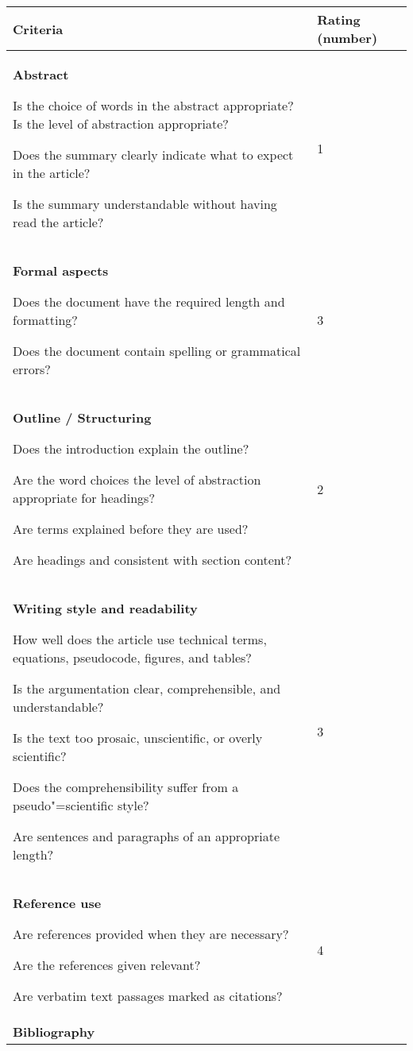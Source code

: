 \documentclass[12pt]{scrartcl}
\begin{document}
\begin{longtable}{|p{12cm}|p{2.5cm}|}	
		\hline
			\textbf{Criteria} & \textbf{Rating (number)} \\
		\hline
		\hline
		\endhead
			\textbf{Abstract}		
						
				Is the choice of words in the abstract appropriate? Is the level of abstraction appropriate?
				
                Does the summary clearly indicate what to expect in the article? 
				
                Is the summary understandable without having read the article?			
			& 1 \ \\
		\hline
			\textbf{Formal aspects}	
				
				Does the document have the required length and formatting?
				
				Does the document contain spelling or grammatical errors?
			& 3 \ \\
		\hline	
			\textbf{Outline / Structuring}		
			
				Does the introduction explain the outline?
				
				Are the word choices the level of abstraction appropriate for headings?
				
				Are terms explained before they are used?
				
				Are headings and consistent with section content?
			& 2 \ \\
		\hline	
			\textbf{Writing style and readability}	
			
				How well does the article use technical terms, equations, pseudocode, figures, and tables?

				Is the argumentation clear, comprehensible, and understandable?

				Is the text too prosaic, unscientific, or overly scientific?
				
				Does the comprehensibility suffer from a pseudo"=scientific style?

				Are sentences and paragraphs of an appropriate length?
			& 3 \ \\			
		\hline	
			\textbf{Reference use}
			
				Are references provided when they are necessary?
				
				Are the references given relevant?
				
				Are verbatim text passages marked as citations?
			& 4 \ \\				
		\hline		
			\textbf{Bibliography}
			

\end{longtable}
\end{document}
